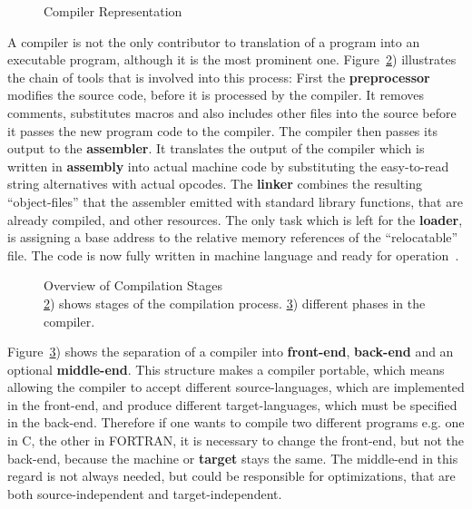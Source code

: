 {\begin{figure}
    \captionsetup{format=plain, indention=.6cm, labelsep=newline,singlelinecheck=false}
    \centering
    \vspace*{-3em}
    
    \caption{\label{fig:compiler} Compiler Representation}
\end{figure}

A compiler is not the only contributor to translation of a program into an executable program, although it is the most prominent one.
Figure~\ref{fig:cmpstruct}) illustrates the chain of tools that is involved into this process:
First the \textbf{preprocessor} modifies the source code, before it is processed by the compiler.
It removes comments, substitutes macros and also includes other files into the source before it passes the new program code to the compiler.
The compiler then passes its output to the \textbf{assembler}.
It translates the output of the compiler which is written in \textbf{assembly} into actual machine code by substituting the easy-to-read string alternatives with actual opcodes.
The \textbf{linker} combines the resulting ``object-files'' that the assembler emitted with standard library functions, that are already compiled, and other resources. 
The only task which is left for the \textbf{loader}, is assigning a base address to the relative memory references of the ``relocatable'' file.
The code is now fully written in machine language and ready for operation~\cite{UBHD-66483012}.

\begin{figure}[htb]
    \centering
    \begin{subfigure}[t]{0.25\textwidth}
        
        \caption{\label{fig:cmpstruct} }
    \end{subfigure} \hspace{2cm}
    \begin{subfigure}[t]{0.37\textwidth}
        
        \caption{\label{fig:cmpintstruct} }
    \end{subfigure}
    \caption{\label{fig:cmp} Overview of Compilation Stages \\ \ref{fig:cmpstruct}) shows stages of the compilation process. \ref{fig:cmpintstruct}) different phases in the compiler.}
\end{figure}

Figure~\ref{fig:cmpintstruct}) shows the separation of a compiler into \textbf{front-end}, \textbf{back-end} and an optional \textbf{middle-end}.
This structure makes a compiler portable, which means allowing the compiler to accept different source-languages, which are implemented in the front-end, and produce different target-languages, which must be specified in the back-end.
Therefore if one wants to compile two different programs e.g. one in C, the other in FORTRAN, it is necessary to change the front-end, but not the back-end, because the machine or \textbf{target} stays the same.
The middle-end in this regard is not always needed, but could be responsible for optimizations, that are both source-independent and target-independent.

}
